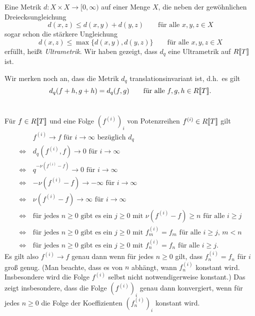 \documentclass[a4paper, 10pt, numbers=noenddot]{scrartcl}
\begin{document}
\begin{remark}
  Eine Metrik $d \colon X \times X \to [0,\infty)$ auf einer Menge $X$, die neben der gewöhnlichen Dreiecksungleichung
  \[
    d(x,z) \leq d(x,y) + d(y,z)
    \qquad
    \text{für alle $x, y, z \in X$}
  \]
  sogar schon die stärkere Ungleichung
  \[
    d(x,z) \leq \max\{ d(x,y), d(y,z) \}
    \qquad
    \text{für alle $x, y, z \in X$}
  \]
  erfüllt, heißt \emph{Ultrametrik}.
  Wir haben gezeigt, dass $d_q$ eine Ultrametrik auf $R[\![T]\!]$ ist.
\end{remark}


Wir merken noch an, dass die Metrik $d_q$ translationsinvariant ist, d.h.\ es gilt
\begin{equation}
  \label{eqn: translation invariance}
    d_q(f + h, g + h)
  = d_q(f, g)
  \qquad
  \text{für alle $f, g, h \in R[\![T]\!]$}.
\end{equation}





\section{}
\label{section: convergence of power series}

Für $f \in R[\![T]\!]$ und eine Folge $(f^{(i)})_i$ von Potenzreihen $f^{(i)} \in R[\![T]\!]$ gilt
\begin{align*}
      &\, \text{$f^{(i)} \to f$ für $i \to \infty$ bezüglich $d_q$} \\
  \iff&\, \text{$d_q(f^{(i)}, f) \to 0$ für $i \to \infty$} \\
  \iff&\, \text{$q^{-\nu(f^{(i)} - f)} \to 0$ für $i \to \infty$} \\
  \iff&\, \text{$-\nu(f^{(i)} - f) \to -\infty$ für $i \to \infty$} \\
  \iff&\, \text{$\nu(f^{(i)} - f) \to \infty$ für $i \to \infty$} \\
  \iff&\, \text{für jedes $n \geq 0$ gibt es ein $j \geq 0$ mit $\nu(f^{(i)} - f) \geq n$ für alle $i \geq j$}  \\
  \iff&\, \text{für jedes $n \geq 0$ gibt es ein $j \geq 0$ mit $f^{(i)}_m = f_m$ für alle $i \geq j$, $m < n$}  \\
  \iff&\, \text{für jedes $n \geq 0$ gibt es ein $j \geq 0$ mit $f^{(i)}_n = f_n$ für alle $i \geq j$}.
\end{align*}
Es gilt also $f^{(i)} \to f$ genau dann wenn für jedes $n \geq 0$ gilt, dass $f^{(i)}_n = f_n$ für $i$ groß genug.
(Man beachte, dass es von $n$ abhängt, wann $f^{(i)}_n$ konstant wird.
Insbesondere wird die Folge $f^{(i)}$ selbst nicht notwendigerweise konstant.)
Das zeigt insbesondere, dass die Folge $(f^{(i)})_i$ genau dann konvergiert, wenn für jedes $n \geq 0$ die Folge der Koeffizienten $(f^{(i)}_n)_i$ konstant wird.
\end{document}
